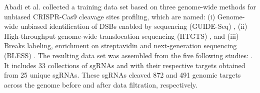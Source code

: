 \documentclass[unnumsec,webpdf,contemporary,large]{oup-authoring-template}
\theoremstyle{thmstyleone}%
\theoremstyle{thmstyletwo}%
\theoremstyle{thmstylethree}%
\begin{document}
Abadi et al. \cite{abadi2017machine} collected a training data set based on three genome-wide methods for unbiased CRISPR-Cas9 cleavage sites profiling, which are named: (i) Genome-wide unbiased identification of DSBs enabled by sequencing (GUIDE-Seq) \cite{tsai2015guide, kleinstiver2016high}, (ii) High-throughput genome-wide translocation sequencing (HTGTS) \cite{frock2015genome}, and (iii) Breaks labeling, enrichment on streptavidin and next-generation sequencing (BLESS) \citep{ran2015vivo, slaymaker2016rationally}. The resulting data set was assembled from the five following studies: \cite{tsai2015guide, kleinstiver2016high, frock2015genome, ran2015vivo, slaymaker2016rationally}. It includes 33 collections of sgRNAs and with their respective targets obtained from 25 unique sgRNAs. These sgRNAs cleaved 872 and 491 genomic targets across the genome before and after data filtration, respectively.
\end{document}
